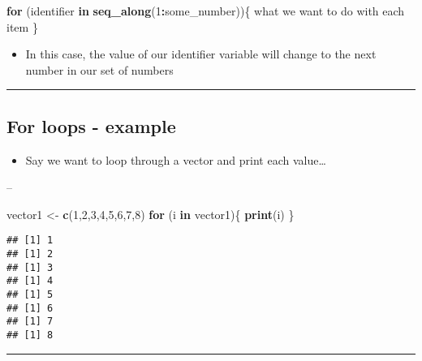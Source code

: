 \documentclass[]{article}
\newenvironment{Shaded}{\begin{snugshade}}{\end{snugshade}}
\newcommand{\ControlFlowTok}[1]{\textcolor[rgb]{0.13,0.29,0.53}{\textbf{#1}}}
\newcommand{\DecValTok}[1]{\textcolor[rgb]{0.00,0.00,0.81}{#1}}
\newcommand{\KeywordTok}[1]{\textcolor[rgb]{0.13,0.29,0.53}{\textbf{#1}}}
\newcommand{\NormalTok}[1]{#1}
\newcommand{\OperatorTok}[1]{\textcolor[rgb]{0.81,0.36,0.00}{\textbf{#1}}}
\newcommand{\StringTok}[1]{\textcolor[rgb]{0.31,0.60,0.02}{#1}}
\providecommand{\tightlist}{%
  \setlength{\itemsep}{0pt}\setlength{\parskip}{0pt}}
\begin{document}
\begin{Shaded}
\begin{Highlighting}[]
\ControlFlowTok{for}\NormalTok{ (identifier }\ControlFlowTok{in} \KeywordTok{seq_along}\NormalTok{(}\DecValTok{1}\OperatorTok{:}\NormalTok{some_number))\{}
\NormalTok{  what we want to do with each item}
\NormalTok{\}}
\end{Highlighting}
\end{Shaded}

\begin{itemize}
\tightlist
\item
  In this case, the value of our identifier variable will change to the
  next number in our set of numbers
\end{itemize}

\begin{center}\rule{0.5\linewidth}{\linethickness}\end{center}

\hypertarget{for-loops---example}{%
\subsection{For loops - example}\label{for-loops---example}}

\begin{itemize}
\tightlist
\item
  Say we want to loop through a vector and print each value\ldots{}
\end{itemize}

--

\begin{Shaded}
\begin{Highlighting}[]
\NormalTok{vector1 <-}\StringTok{ }\KeywordTok{c}\NormalTok{(}\DecValTok{1}\NormalTok{,}\DecValTok{2}\NormalTok{,}\DecValTok{3}\NormalTok{,}\DecValTok{4}\NormalTok{,}\DecValTok{5}\NormalTok{,}\DecValTok{6}\NormalTok{,}\DecValTok{7}\NormalTok{,}\DecValTok{8}\NormalTok{)}
\ControlFlowTok{for}\NormalTok{ (i }\ControlFlowTok{in}\NormalTok{ vector1)\{}
  \KeywordTok{print}\NormalTok{(i)}
\NormalTok{\}}
\end{Highlighting}
\end{Shaded}

\begin{verbatim}
## [1] 1
## [1] 2
## [1] 3
## [1] 4
## [1] 5
## [1] 6
## [1] 7
## [1] 8
\end{verbatim}

\begin{center}\rule{0.5\linewidth}{\linethickness}\end{center}
\end{document}
